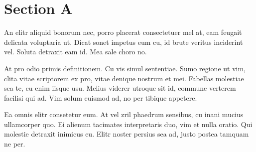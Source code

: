 \section{Section A}

An elitr aliquid bonorum nec, porro placerat consectetuer mel at, eam feugait delicata voluptaria ut. Dicat sonet impetus eum cu, id brute veritus inciderint vel. Soluta detraxit eam id. Mea sale choro no.

At pro odio primis definitionem. Cu vis simul sententiae. Sumo regione ut vim, clita vitae scriptorem ex pro, vitae denique nostrum et mei. Fabellas molestiae sea te, cu enim iisque usu. Melius viderer utroque sit id, commune verterem facilisi qui ad. Vim solum euismod ad, no per tibique appetere.

Ea omnis elitr consetetur eum. At vel zril phaedrum sensibus, cu inani mucius ullamcorper quo. Ei alienum tacimates interpretaris duo, vim et nulla oratio. Qui molestie detraxit inimicus eu. Elitr noster persius sea ad, justo postea tamquam ne per.